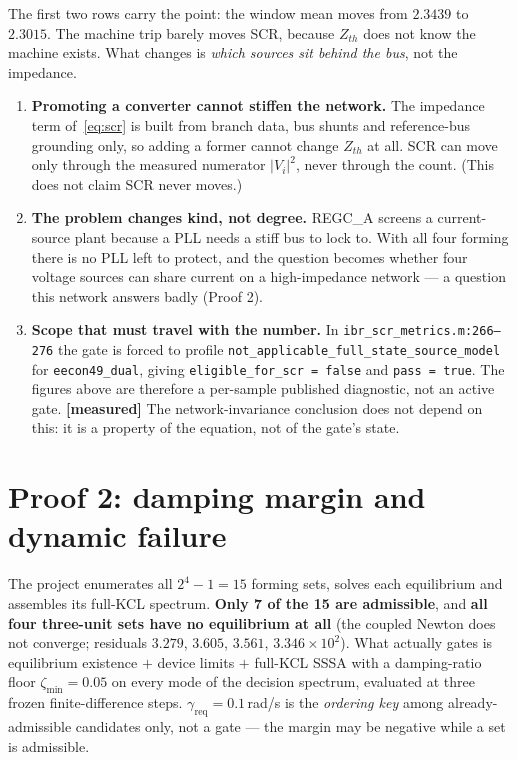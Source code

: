 \documentclass[11pt,a4paper]{article}
\newcommand{\code}[1]{\texttt{\small #1}}
\newcommand{\zmin}{\zeta_{\min}}
\newcommand{\mes}{\textcolor{ok}{\textbf{[measured]}}}
\begin{document}
\noindent
The first two rows carry the point: the window mean moves from $2.3439$ to
$2.3015$. The machine trip barely moves SCR, because $Z_{th}$ does not know the
machine exists. What changes is \emph{which sources sit behind the bus}, not the
impedance.

\begin{enumerate}
\item \textbf{Promoting a converter cannot stiffen the network.} The impedance
      term of~\eqref{eq:scr} is built from branch data, bus shunts and
      reference-bus grounding only, so adding a former cannot change $Z_{th}$ at
      all. SCR can move only through the measured numerator $|V_i|^2$, never
      through the count. (This does not claim SCR never moves.)
\item \textbf{The problem changes kind, not degree.} REGC\_A screens a
      current-source plant because a PLL needs a stiff bus to lock to. With all
      four forming there is no PLL left to protect, and the question becomes
      whether four voltage sources can share current on a high-impedance network
      --- a question this network answers badly (Proof 2).
\item \textbf{Scope that must travel with the number.} In
      \code{ibr\_scr\_metrics.m:266--276} the gate is forced to profile
      \code{not\_applicable\_\allowbreak full\_state\_\allowbreak source\_model}
      for \code{eecon49\_dual}, giving \code{eligible\_for\_scr = false} and
      \code{pass = true}. The figures above are therefore a per-sample published
      diagnostic, not an active gate. \mes{} The network-invariance conclusion
      does not depend on this: it is a property of the equation, not of the
      gate's state.
\end{enumerate}

\section{Proof 2: damping margin and dynamic failure}

\noindent
The project enumerates all $2^4-1 = 15$ forming sets, solves each equilibrium and
assembles its full-KCL spectrum. \textbf{Only 7 of the 15 are admissible}, and
\textbf{all four three-unit sets have no equilibrium at all} (the coupled Newton
does not converge; residuals $3.279$, $3.605$, $3.561$, $3.346\times10^{2}$).
What actually gates is equilibrium existence $+$ device limits $+$ full-KCL SSSA
with a damping-ratio floor $\zmin = 0.05$ on every mode of the decision spectrum,
evaluated at three frozen finite-difference steps. $\gamma_{\mathrm{req}} =
0.1$\,rad/s is the \emph{ordering key} among already-admissible candidates only,
not a gate --- the margin may be negative while a set is admissible.
\end{document}
